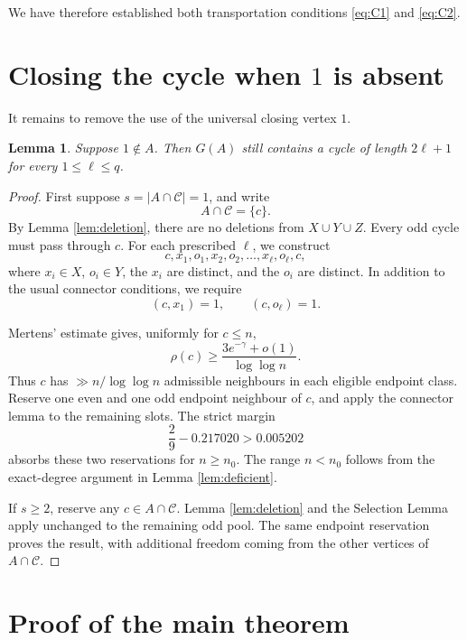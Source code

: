 \documentclass{article}
\newtheorem{lemma}[theorem]{Lemma}
\theoremstyle{remark}
\newcommand{\Ccal}{\mathcal{C}}
\begin{document}
We have therefore established both transportation conditions
\eqref{eq:C1} and \eqref{eq:C2}.

\section{Closing the cycle when \(1\) is absent}

It remains to remove the use of the universal closing vertex \(1\).

\begin{lemma}\label{lem:closer}
Suppose \(1\notin A\). Then \(G(A)\) still contains a cycle of length
\(2\ell+1\) for every \(1\leq\ell\leq q\).
\end{lemma}

\begin{proof}
First suppose \(s=|A\cap\Ccal|=1\), and write
\[
 A\cap\Ccal=\{c\}.
\]
By Lemma \ref{lem:deletion}, there are no deletions from \(X\cup Y\cup
Z\). Every odd cycle must pass through \(c\). For each prescribed
\(\ell\), we construct
\[
 c,x_1,o_1,x_2,o_2,\ldots,x_\ell,o_\ell,c,
\]
where \(x_i\in X\), \(o_i\in Y\), the \(x_i\) are distinct, and the
\(o_i\) are distinct. In addition to the usual connector conditions,
we require
\[
 (c,x_1)=1,
 \qquad
 (c,o_\ell)=1.
\]

Mertens' estimate gives, uniformly for \(c\leq n\),
\[
 \rho(c)
 \geq
 \frac{3e^{-\gamma}+o(1)}{\log\log n}.
\]
Thus \(c\) has \(\gg n/\log\log n\) admissible neighbours in each
eligible endpoint class. Reserve one even and one odd endpoint
neighbour of \(c\), and apply the connector lemma to the remaining
slots. The strict margin
\[
 \frac29-0.217020>0.005202
\]
absorbs these two reservations for \(n\geq n_0\). The range
\(n<n_0\) follows from the exact-degree argument in Lemma
\ref{lem:deficient}.

If \(s\geq2\), reserve any \(c\in A\cap\Ccal\). Lemma
\ref{lem:deletion} and the Selection Lemma apply unchanged to the
remaining odd pool. The same endpoint reservation proves the result,
with additional freedom coming from the other vertices of
\(A\cap\Ccal\).
\end{proof}

\section{Proof of the main theorem}
\end{document}
